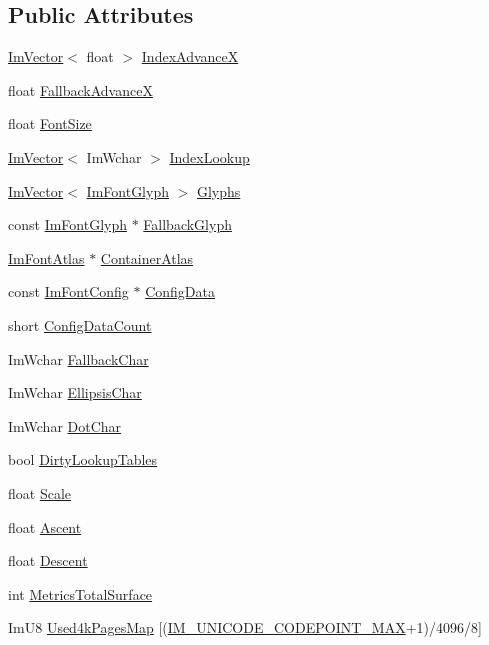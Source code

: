 \subsection*{Public Attributes}
\begin{DoxyCompactItemize}
\item 
\hyperlink{structImVector}{Im\+Vector}$<$ float $>$ \hyperlink{structImFont_af906476eda06d8a842d0a843a247f530}{Index\+AdvanceX}
\item 
float \hyperlink{structImFont_ad58a5ee4492a3a9fa56f73e5a40d728d}{Fallback\+AdvanceX}
\item 
float \hyperlink{structImFont_a423e36d1594281f1a5a537e5b0d0a3d4}{Font\+Size}
\item 
\hyperlink{structImVector}{Im\+Vector}$<$ Im\+Wchar $>$ \hyperlink{structImFont_a0c948f3741da03da9bc1731e236173c8}{Index\+Lookup}
\item 
\hyperlink{structImVector}{Im\+Vector}$<$ \hyperlink{structImFontGlyph}{Im\+Font\+Glyph} $>$ \hyperlink{structImFont_a1a0901fc1a8cbd41d582d6cef4946bc9}{Glyphs}
\item 
const \hyperlink{structImFontGlyph}{Im\+Font\+Glyph} $\ast$ \hyperlink{structImFont_a0e666b0c49646bd294103f4d288df4b8}{Fallback\+Glyph}
\item 
\hyperlink{structImFontAtlas}{Im\+Font\+Atlas} $\ast$ \hyperlink{structImFont_a8a5e0df6be5e3cabe91ae830524db960}{Container\+Atlas}
\item 
const \hyperlink{structImFontConfig}{Im\+Font\+Config} $\ast$ \hyperlink{structImFont_afff4a317b215a37599589941d6131fd0}{Config\+Data}
\item 
short \hyperlink{structImFont_a4a30fc7711d628ad582ccb3188a51ddd}{Config\+Data\+Count}
\item 
Im\+Wchar \hyperlink{structImFont_ae54c2c4184bfcbc7b8f6da9cbc4f93c0}{Fallback\+Char}
\item 
Im\+Wchar \hyperlink{structImFont_a51df9d341917235207db60e775b11621}{Ellipsis\+Char}
\item 
Im\+Wchar \hyperlink{structImFont_a5b3a02d55d614aad63487421e05ce1e2}{Dot\+Char}
\item 
bool \hyperlink{structImFont_a3858e851f69b3abbbefad76030a546ff}{Dirty\+Lookup\+Tables}
\item 
float \hyperlink{structImFont_ae98fb07fd8862a7243d77b11f38bba19}{Scale}
\item 
float \hyperlink{structImFont_a5238ef18f8ad02b783fb8b3a195b708e}{Ascent}
\item 
float \hyperlink{structImFont_abcca12aa908bf7105433e7db6088a5e5}{Descent}
\item 
int \hyperlink{structImFont_a8087b2ee8b27dcf5c6e30a8318f87cc7}{Metrics\+Total\+Surface}
\item 
Im\+U8 \hyperlink{structImFont_a95184d1095ecc7da9c843579052e1009}{Used4k\+Pages\+Map} \mbox{[}(\hyperlink{imgui_8h_aefe19804994a49c4e39032acbfe49e0d}{I\+M\+\_\+\+U\+N\+I\+C\+O\+D\+E\+\_\+\+C\+O\+D\+E\+P\+O\+I\+N\+T\+\_\+\+M\+AX}+1)/4096/8\mbox{]}
\end{DoxyCompactItemize}


